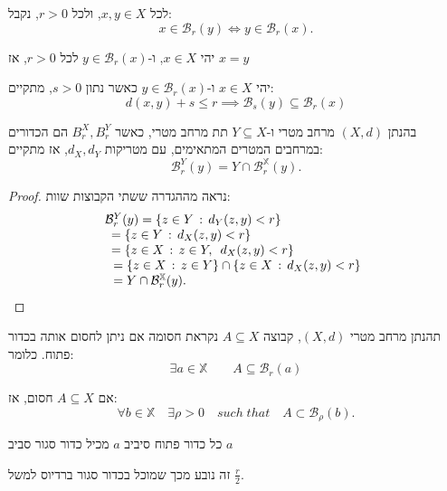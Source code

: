 \documentclass{tstextbook}
\begin{document}
\begin{lemma}
לכל \(x,y\in X\), ולכל \(r>0\), נקבל:
$$x\in{\mathcal{B}}_{r}(y)\iff y\in{\mathcal{B}}_{r}(x).$$

\end{lemma}
\begin{lemma}
יהי \(x \in X\), ו-\(y\in \mathcal{B}_{r}(x)\) לכל \(r>0\), אז \(x=y\)

\end{lemma}
\begin{lemma}
יהי \(x \in X\) ו-\(y\in \mathcal{B}_{r}(x)\) כאשר נתון \(s>0\), מתקיים:
$$d(x,y)+s\leq r\implies \mathcal{B}_{s}(y)\subseteq  \mathcal{B}_{r}(x)$$

\end{lemma}
\begin{proposition}
בהנתן \((X,d)\) מרחב מטרי ו-\(Y\subseteq X\) תת מרחב מטרי, כאשר \(B^X_{r},B_{r}^Y\) הם הכדורים במרחבים המטרים המתאימים, עם מטריקות \(d_{X},d_{Y}\), אז מתקיים:
$$\mathcal{B}_{r}^{Y}(y)=Y\cap\mathcal{B}_{r}^{\mathbb{X}}(y).$$

\end{proposition}
\begin{proof}
נראה מההגדרה ששתי הקבוצות שוות:
$$\begin{array}{l l}{{{\mathcal{B}}_{r}^{Y}(y)=\{z\in Y\,:\,d_{Y}(z,y)<r\}}}\\ {{\begin{array}{l}{{=\{z\in Y\,:\,d_{X}(z,y)<r\}}}\\ {{=\{z\in X\,:\,z\in Y,\,\ d_{X}(z,y)<r\}}}\\ {{\,=\{z\in X\,:\,z\in Y\}\cap\{z\in X\,:\,d_{X}(z,y)<r\}}}\\ {{\,=Y\cap{\mathcal{B}}_{r}^{\mathbb{X}}(y).}}\end{array}}}\end{array}$$

\end{proof}
\begin{definition}
תהנתן מרחב מטרי \((X,d)\), קבוצה \(A\subseteq X\) נקראת חסומה אם ניתן לחסום אותה בכדור פתוח. כלומר:
$$\exists a\in\mathbb{X}\qquad A\subseteq{\mathcal{B}}_{r}(a)$$

\end{definition}
\begin{lemma}
אם \(A\subseteq X\) חסום, אז:
$$\forall b\in\mathbb{X}\quad\exists\rho>0\quad s u c h\;t h a t\quad A\subset{\mathcal{B}}_{\rho}(b).$$

\end{lemma}
\begin{lemma}
כל כדור פתוח סיביב \(a\) מכיל כדור סגור סביב \(a\)

\end{lemma}
זה נובע מכך שמוכל בכדור סגור ברדיוס למשל \(\frac{r}{2}\).
\end{document}
